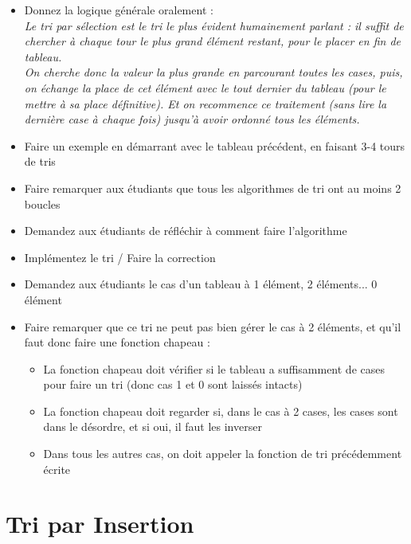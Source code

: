 \documentclass[11pt,a4paper]{article}
\begin{document}
\begin{itemize}
\item Donnez la logique générale oralement : \\
  \og \textit{Le tri par sélection est le tri le plus évident humainement parlant : il suffit de chercher à chaque tour le plus grand élément restant, pour le placer en fin de tableau.} \fg{} \\
  \og \textit{On cherche donc la valeur la plus grande en parcourant toutes les cases, puis, on échange la place de cet élément avec le tout dernier du tableau (pour le mettre à sa place définitive). Et on recommence ce traitement (sans lire la dernière case à chaque fois) jusqu'à avoir ordonné tous les éléments.} \fg{} \\
\item Faire un exemple en démarrant avec le tableau précédent, en faisant 3-4 tours de tris \\
\item Faire remarquer aux étudiants que tous les algorithmes de tri ont au moins 2 boucles \\
\item Demandez aux étudiants de réfléchir à comment faire l'algorithme \\
\item Implémentez le tri / Faire la correction \\
\item Demandez aux étudiants le cas d'un tableau à 1 élément, 2 éléments... 0 élément \\
\item Faire remarquer que ce tri ne peut pas bien gérer le cas à 2 éléments, et qu'il faut donc faire une fonction chapeau :
  \begin{itemize}
  \item La fonction chapeau doit vérifier si le tableau a suffisamment de cases pour faire un tri (donc cas 1 et 0 sont laissés intacts)
  \item La fonction chapeau doit regarder si, dans le cas à 2 cases, les cases sont dans le désordre, et si oui, il faut les inverser
  \item Dans tous les autres cas, on doit appeler la fonction de tri précédemment écrite
  \end{itemize}
\end{itemize}



\section{Tri par Insertion}
\end{document}
